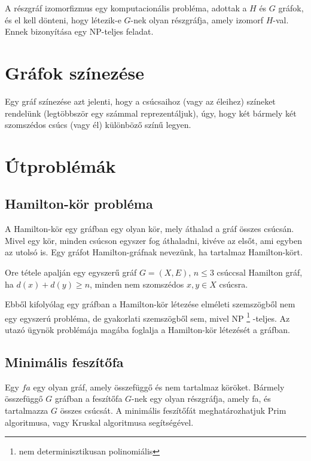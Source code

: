 A részgráf izomorfizmus egy komputacionális probléma, adottak a \(H\) és \(G\) gráfok, és el kell dönteni, hogy létezik-e \(G\)-nek olyan részgráfja, amely izomorf \(H\)-val. Ennek bizonyítása egy NP-teljes feladat.

\section{Gráfok színezése}\label{sec:ALAP:adatelem}

Egy gráf színezése azt jelenti, hogy a csúcsaihoz (vagy az éleihez) színeket rendelünk (legtöbbször egy számmal reprezentáljuk), úgy, hogy két bármely két szomszédos csúcs (vagy él) különböző színű legyen.

\section{Útproblémák}\label{sec:ALAP:adatelem}

\subsection{Hamilton-kör probléma}

A Hamilton-kör egy gráfban egy olyan kör, mely áthalad a gráf összes csúcsán. Mivel egy kör, minden csúcson egyszer fog áthaladni, kivéve az elsőt, ami egyben az utolsó is. Egy gráfot Hamilton-gráfnak nevezünk, ha tartalmaz Hamilton-kört.

Ore tétele apalján egy egyszerű gráf \(G = (X,E)\), \(n \leq 3\) csúccsal Hamilton gráf, ha \(d(x) + d(y)  \geq n\), minden nem szomszédos \(x,y \in X\) csúcsra.

Ebből kifolyólag egy gráfban a Hamilton-kör létezése elméleti szemszögből nem egy egyszerú probléma, de gyakorlati szemszögből sem, mivel NP%
\footnote{ %
	nem determinisztikusan polinomiális
}  %
-teljes. Az utazó ügynök problémája magába foglalja a Hamilton-kör létezését a gráfban.

\subsection{Minimális feszítőfa}

Egy \(fa\) egy olyan gráf, amely összefüggő és nem tartalmaz köröket. Bármely összefüggő \(G\) gráfban a feszítőfa \(G\)-nek egy olyan részgráfja, amely fa, és tartalmazza \(G\) összes csúcsát. A minimális feszítőfát meghatározhatjuk Prim algoritmusa, vagy Kruskal algoritmusa segítségével.

